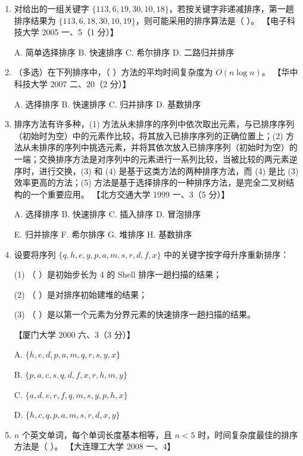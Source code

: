 \documentclass[lang=cn,newtx,10pt,scheme=chinese]{elegantbook}
\begin{document}
\begin{enumerate}
    \item 对给出的一组关键字 $\{113, 6, 19, 30, 10, 18\}$，若按关键字非递减排序，第一趟排序结果为 $\{113, 6, 18, 30, 10, 19\}$，则可能采用的排序算法是（ ）。  
    【电子科技大学 2005 一、5（1 分）】  

    A. 简单选择排序 \quad B. 快速排序 \quad C. 希尔排序 \quad D. 二路归并排序  

    \item （多选）在下列排序中，（ ）方法的平均时间复杂度为 $O(n \log n)$。  
    【华中科技大学 2007 二、20（2 分）】  

    A. 选择排序 \quad B. 快速排序 \quad C. 归并排序 \quad D. 基数排序 

    \item 排序方法有许多种，(1) 方法从未排序的序列中依次取出元素，与已排序序列（初始时为空）中的元素作比较，将其放入已排序序列的正确位置上；(2) 方法从未排序的序列中挑选元素，并将其依次放入已排序序列（初始时为空）的一端；交换排序方法是对序列中的元素进行一系列比较，当被比较的两元素逆序时，进行交换，(3) 和 (4) 是基于这类方法的两种排序方法，而 (4) 是比 (3) 效率更高的方法；(5) 方法是基于选择排序的一种排序方法，是完全二叉树结构的一个重要应用。  
    【北方交通大学 1999 一、3（5 分）】 

    A. 选择排序 \quad B. 快速排序 \quad C. 插入排序 \quad D. 冒泡排序  
    
    E. 归并排序 \quad F. 希尔排序 \quad G. 堆排序 \quad H. 基数排序  

    \item 设要将序列 $\{q, h, e, y, p, a, m, s, r, d, f, x\}$ 中的关键字按字母升序重新排序：  
   
    (1) （ ）是初始步长为 4 的 Shell 排序一趟扫描的结果；  

    (2) （ ）是对排序初始建堆的结果；  

    (3) （ ）是以第一个元素为分界元素的快速排序一趟扫描的结果。  

    【厦门大学 2000 六、3（3 分）】  

    A. $\{h, e, d, p, a, m, q, r, s, y, x\}$  

    B. $\{p, a, c, s, q, d, f, x, r, h, m, y\}$  

    C. $\{a, d, e, r, f, q, m, s, y, p, h, x\}$  

    D. $\{h, c, q, p, a, m, s, r, d, x, y\}$  

    \item $n$ 个英文单词，每个单词长度基本相等，且 $n < 5$ 时，时间复杂度最佳的排序方法是（ ）。  
    【大连理工大学 2008 一、4】  


\end{enumerate}
\end{document}
